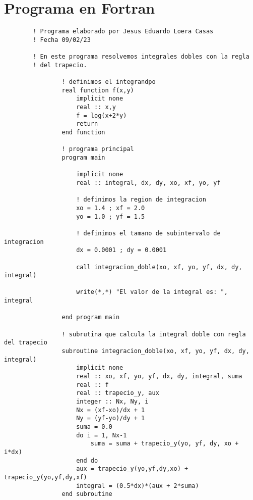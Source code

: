 \section{Programa en Fortran}


\begin{lstlisting}
        ! Programa elaborado por Jesus Eduardo Loera Casas
        ! Fecha 09/02/23
        
        ! En este programa resolvemos integrales dobles con la regla
        ! del trapecio.
        
                ! definimos el integrandpo 
                real function f(x,y)
                    implicit none
                    real :: x,y
                    f = log(x+2*y)
                    return
                end function
        
                ! programa principal
                program main
        
                    implicit none
                    real :: integral, dx, dy, xo, xf, yo, yf
        
                    ! definimos la region de integracion
                    xo = 1.4 ; xf = 2.0
                    yo = 1.0 ; yf = 1.5
        
                    ! definimos el tamano de subintervalo de integracion
                    dx = 0.0001 ; dy = 0.0001
        
                    call integracion_doble(xo, xf, yo, yf, dx, dy, integral)
        
                    write(*,*) "El valor de la integral es: ", integral
        
                end program main
        
                ! subrutina que calcula la integral doble con regla del trapecio
                subroutine integracion_doble(xo, xf, yo, yf, dx, dy, integral)
                    implicit none
                    real :: xo, xf, yo, yf, dx, dy, integral, suma
                    real :: f
                    real :: trapecio_y, aux
                    integer :: Nx, Ny, i
                    Nx = (xf-xo)/dx + 1
                    Ny = (yf-yo)/dy + 1
                    suma = 0.0
                    do i = 1, Nx-1
                        suma = suma + trapecio_y(yo, yf, dy, xo + i*dx)
                    end do
                    aux = trapecio_y(yo,yf,dy,xo) + trapecio_y(yo,yf,dy,xf)
                    integral = (0.5*dx)*(aux + 2*suma)
                end subroutine
        

\end{lstlisting}
